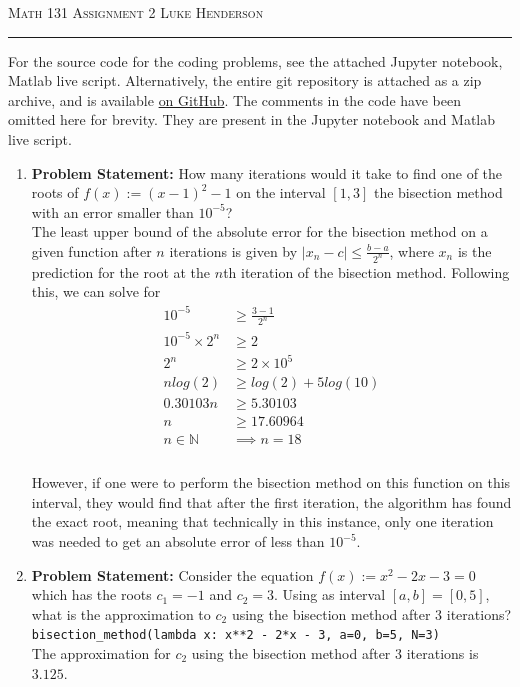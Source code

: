 \documentclass[12pt]{amsart}
\begin{document}
{\scshape Math 131} \hfill {\scshape \large Assignment 2} \hfill {\scshape Luke Henderson}
\smallskip
\hrule
\bigskip

For the source code for the coding problems, see the attached Jupyter notebook, Matlab live script. Alternatively, the entire git repository  is attached as a zip archive, and is available \href{https://github.com/blackHat-Magic/Math-131-HW2}{on GitHub}. The comments in the code have been omitted here for brevity. They are present in the Jupyter notebook and Matlab live script.

\begin{enumerate}
\item\textbf{Problem Statement:} How many iterations would it take to find one of the roots of $f(x) := (x - 1)^2 - 1$ on the interval $[1, 3]$ the bisection method with an error smaller than $10^{-5}$? \\
The least upper bound of the absolute error for the bisection method on a given function after $n$ iterations is given by $|x_n - c| \leq \frac{b - a}{2^n}$, where $x_n$ is the prediction for the root at the $n$th iteration of the bisection method. Following this, we can solve for
\begin{align*}
10^{-5} & \geq \frac{3 - 1}{2^n} \\
10^{-5} \times 2^n & \geq 2 \\
2^n & \geq 2 \times 10^5 \\
nlog(2) & \geq log(2) + 5log(10) \\
0.30103n & \geq 5.30103 \\
n & \geq 17.60964 \\
n \in \mathbb{N} & \implies n = 18 \\
\end{align*} \\
However, if one were to perform the bisection method on this function on this interval, they would find that after the first iteration, the algorithm has found the exact root, meaning that technically in this instance, only one iteration was needed to get an absolute error of less than $10^{-5}$. \\
\bigskip

\item\textbf{Problem Statement:} Consider the equation $f(x) := x^2 - 2x - 3 = 0$ which has the roots $c_1 = -1$ and $c_2 = 3$. Using as interval $[a, b] = [0, 5]$, what is the approximation to $c_2$ using the bisection method after 3 iterations? \\
\texttt{bisection\_method(lambda x: x**2 - 2*x - 3, a=0, b=5, N=3)} \\
The approximation for $c_2$ using the bisection method after 3 iterations is $3.125$.
\bigskip


\end{enumerate}
\end{document}
